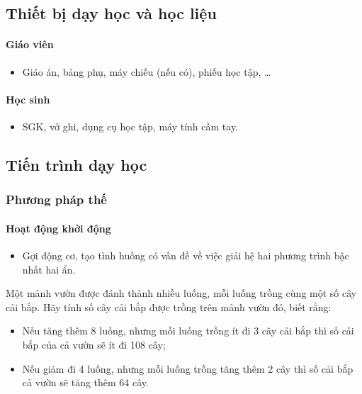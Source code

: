 \subsection{Thiết bị dạy học và học liệu}

\paragraph{Giáo viên}

\begin{itemize}
    \item Giáo án, bảng phụ, máy chiếu (nếu có), phiếu học tập, … 
\end{itemize}

\paragraph{Học sinh}

\begin{itemize}
    \item SGK, vở ghi, dụng cụ học tập, máy tính cầm tay. 
\end{itemize}

\subsection{Tiến trình dạy học}

\danhsachtiet

\subsubsection{Phương pháp thế}

\paragraph{Hoạt động khởi động}

\muctieu

\begin{itemize}
    \item Gợi động cơ, tạo tình huống có vấn đề về việc giải hệ hai phương trình bậc nhất hai ẩn. 
\end{itemize}

\noidungsanpham

\begin{modau}
    Một mảnh vườn được đánh thành nhiều luống, mỗi luống trồng cùng một số cây cải bắp. Hãy tính số cây cải bắp được trồng trên mảnh vườn đó, biết rằng:
    \begin{itemize}
    \item Nếu tăng thêm 8 luống, nhưng mỗi luống trồng ít đi 3 cây cải bắp thì số cải bắp của cả vườn sẽ ít đi 108 cây;
    \item Nếu giảm đi 4 luống, nhưng mỗi luống trồng tăng thêm 2 cây thì số cải bắp cả vườn sẽ tăng thêm 64 cây.
    \end{itemize}
\end{modau}

